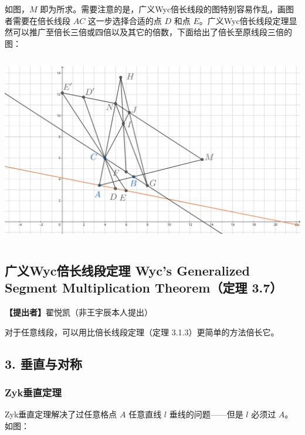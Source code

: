\documentclass[UTF8]{article}
\begin{document}
如图，\(M\)
即为所求。需要注意的是，广义Wyc倍长线段的图特别容易作乱，画图者需要在倍长线段
\(AC\) 这一步选择合适的点 \(D\) 和点
\(E\)。广义Wyc倍长线段定理显然可以推广至倍长三倍或四倍以及其它的倍数，下面给出了倍长至原线段三倍的图：

\includegraphics[width=5.76806in,height=3.27847in]{media/image43.png}

\hypertarget{ux5e7fux4e49wycux500dux957fux7ebfux6bb5ux5b9aux7406-wycs-generalized-segment-multiplication-theoremux5b9aux7406-3.7}{%
\subsection{广义Wyc倍长线段定理 Wyc's Generalized Segment Multiplication
Theorem（定理
3.7）}\label{ux5e7fux4e49wycux500dux957fux7ebfux6bb5ux5b9aux7406-wycs-generalized-segment-multiplication-theoremux5b9aux7406-3.7}}

\textbf{【提出者】}翟悦凯（非王宇辰本人提出）

对于任意线段，可以用比倍长线段定理（定理 3.1.3）更简单的方法倍长它。

\subsection{3. 垂直与对称}

\hypertarget{zykux5782ux76f4ux5b9aux7406}{%
\subsubsection{Zyk垂直定理}\label{zykux5782ux76f4ux5b9aux7406}}

Zyk垂直定理解决了过任意格点 \(A\) 任意直线 \(l\) 垂线的问题------但是
\(l\) 必须过 \(A\)。如图：
\end{document}
